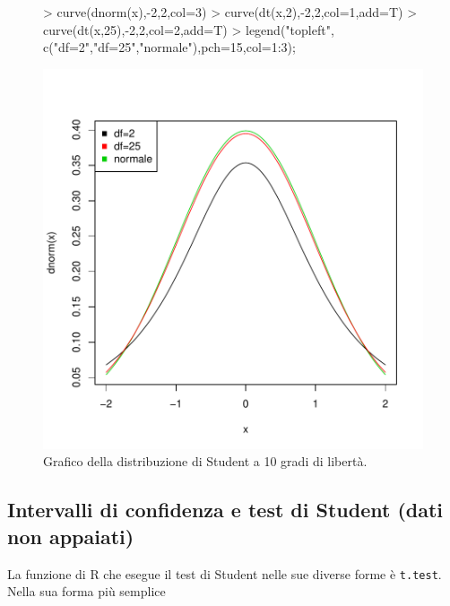 \documentclass[onecolumn,12pt]{book}
\begin{document}
\begin{figure}[H]
\begin{center}
\begin{Schunk}
\begin{Sinput}
> curve(dnorm(x),-2,2,col=3)
> curve(dt(x,2),-2,2,col=1,add=T)
> curve(dt(x,25),-2,2,col=2,add=T)
> legend("topleft", c("df=2","df=25","normale"),pch=15,col=1:3);
\end{Sinput}
\end{Schunk}
\includegraphics{RbookParte2-161}
\caption{Grafico della distribuzione di Student a 10 gradi di libert\`a. }
\label{fig:graficostudent}
\end{center}
\end{figure}
 \subsection
{Intervalli di confidenza e test di Student (dati non appaiati)}
La funzione di
\textsf{R} che esegue il test di Student nelle sue diverse forme \`e  \texttt{t.test}.   Nella sua forma pi\`u semplice
\end{document}
